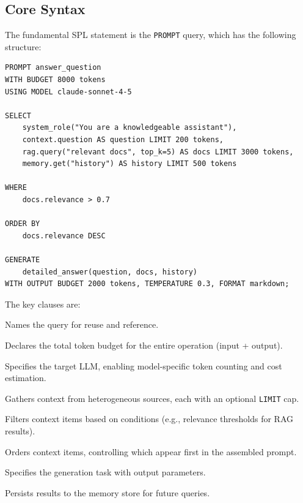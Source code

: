 \documentclass[11pt,a4paper]{article}
\begin{document}
\subsection{Core Syntax}

The fundamental SPL statement is the \texttt{PROMPT} query, which has the following structure:

\begin{lstlisting}[language=SPL, caption={Basic SPL query structure}]
PROMPT answer_question
WITH BUDGET 8000 tokens
USING MODEL claude-sonnet-4-5

SELECT
    system_role("You are a knowledgeable assistant"),
    context.question AS question LIMIT 200 tokens,
    rag.query("relevant docs", top_k=5) AS docs LIMIT 3000 tokens,
    memory.get("history") AS history LIMIT 500 tokens

WHERE
    docs.relevance > 0.7

ORDER BY
    docs.relevance DESC

GENERATE
    detailed_answer(question, docs, history)
WITH OUTPUT BUDGET 2000 tokens, TEMPERATURE 0.3, FORMAT markdown;
\end{lstlisting}

The key clauses are:

\begin{description}[nosep]
  \item[\texttt{PROMPT <name>}] Names the query for reuse and reference.
  \item[\texttt{WITH BUDGET <n> tokens}] Declares the total token budget for the entire operation (input + output).
  \item[\texttt{USING MODEL <model>}] Specifies the target LLM, enabling model-specific token counting and cost estimation.
  \item[\texttt{SELECT}] Gathers context from heterogeneous sources, each with an optional \texttt{LIMIT} cap.
  \item[\texttt{WHERE}] Filters context items based on conditions (e.g., relevance thresholds for RAG results).
  \item[\texttt{ORDER BY}] Orders context items, controlling which appear first in the assembled prompt.
  \item[\texttt{GENERATE}] Specifies the generation task with output parameters.
  \item[\texttt{STORE RESULT IN memory.<key>}] Persists results to the memory store for future queries.
\end{description}
\end{document}

